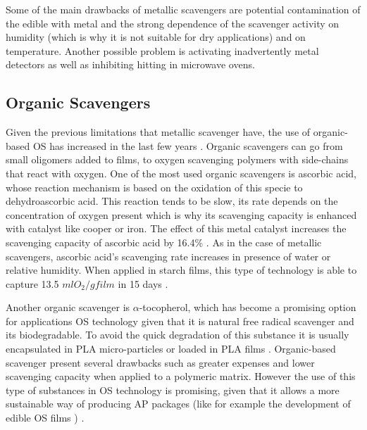 \begin{refsection}
Some of the main drawbacks of metallic scavengers are potential contamination of the edible with metal and the strong dependence of the scavenger activity on humidity (which is why it is not suitable for dry applications) and on temperature. Another possible problem is activating inadvertently metal detectors as well as inhibiting hitting in microwave ovens.   

\subsection{Organic Scavengers}\label{subsec:organic_os}
Given the previous limitations that metallic scavenger have, the  use of organic-based OS has increased in the last few years \cite{Gaikwad2018OxygenPackaging}. Organic scavengers can go from small oligomers added to films,  to  oxygen scavenging polymers  with side-chains that react with oxygen. One of the most used organic scavengers is ascorbic acid, whose reaction mechanism is based on the oxidation of this specie to dehydroascorbic acid. This reaction tends to be slow, its rate depends on the concentration of oxygen  present which is why its scavenging capacity is enhanced with catalyst like cooper or iron. The effect of this metal catalyst  increases the scavenging capacity of ascorbic acid by 16.4\% \cite{Uluata2015HowEmulsions}. As in the case of metallic scavengers, ascorbic acid's scavenging rate increases in presence of water or relative humidity. When applied in starch films, this type of technology is able to capture 13.5 $ml O_2/g film$  in 15 days \cite{Mahieu2015ThermoplasticContent}.  

Another organic scavenger is $\alpha$-tocopherol, which has become a promising option for applications OS technology given that it is natural free radical scavenger and its biodegradable. To avoid the quick degradation of this substance it is usually encapsulated in PLA micro-particles or loaded in PLA films \cites{DiMaio2014PreparationPackaging}{Scarfato2017PreparationApplications}. 
Organic-based scavenger present several drawbacks such as greater expenses and lower scavenging capacity when applied to a polymeric matrix. However the use of this type of substances in OS technology is promising, given that it allows a more sustainable way of producing AP packages (like for example the development of edible OS films \cite{Janjarasskul2011WheyAcid}) \cite{Gaikwad2018OxygenPackaging}. 


\end{refsection}
